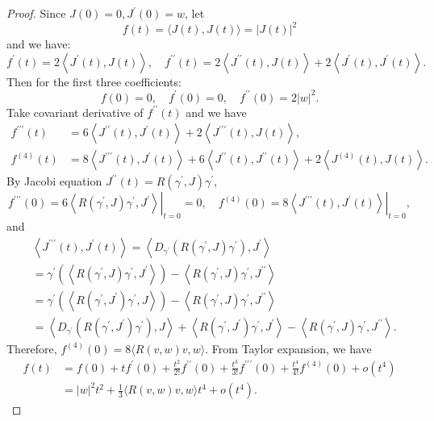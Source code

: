 \documentclass{ctexart}
\begin{document}
\begin{proof}[Proof]
  Since $J(0)=0, J^{\prime}(0)=w$, let 
  $$
  f(t)=\langle J(t), J(t)\rangle=|J(t)|^2
  $$
  and we have: 
  $$
  f^{\prime}(t)=2\left\langle J^{\prime}(t), J(t)\right\rangle, \quad f^{\prime \prime}(t)=2\left\langle J^{\prime \prime}(t), J(t)\right\rangle+2\left\langle J^{\prime}(t), J^{\prime}(t)\right\rangle .
  $$
  Then for the first three coefficients: 
  $$
  f(0)=0, \quad f^{\prime}(0)=0, \quad f^{\prime \prime}(0)=2|w|^2.
  $$
  Take covariant derivative of $f^{\prime \prime}(t)$ and we have 
  $$
  \begin{aligned}
  f^{\prime \prime \prime}(t) & =6\left\langle J^{\prime \prime}(t), J^{\prime}(t)\right\rangle+2\left\langle J^{\prime \prime \prime}(t), J(t)\right\rangle, \\
  f^{(4)}(t) & =8\left\langle J^{\prime \prime \prime}(t), J^{\prime}(t)\right\rangle+6\left\langle J^{\prime \prime}(t), J^{\prime \prime}(t)\right\rangle+2\left\langle J^{(4)}(t), J(t)\right\rangle .
  \end{aligned}
  $$
  By Jacobi equation $J^{\prime \prime}(t)= R\left(\gamma^{\prime}, J\right) \gamma^{\prime}$, 
  $$
  f^{\prime \prime \prime}(0)=\left.6\left\langle R\left(\gamma^{\prime}, J\right) \gamma^{\prime}, J^{\prime}\right\rangle\right|_{t=0}=0, \quad f^{(4)}(0)=\left.8\left\langle J^{\prime \prime \prime}(t), J^{\prime}(t)\right\rangle\right|_{t=0},
  $$
  and 
  $$
  \begin{aligned}
  &\left\langle J^{\prime \prime \prime}(t), J^{\prime}(t)\right\rangle=\left\langle D_{\gamma^{\prime}}\left( R\left(\gamma^{\prime}, J\right) \gamma^{\prime}\right), J^{\prime}\right\rangle \\
  &= \gamma^{\prime}\left(\left\langle R\left(\gamma^{\prime}, J\right) \gamma^{\prime}, J^{\prime}\right\rangle\right)-\left\langle R\left(\gamma^{\prime}, J\right) \gamma^{\prime}, J^{\prime \prime}\right\rangle \\
  &= \gamma^{\prime}\left(\left\langle R\left(\gamma^{\prime}, J^{\prime}\right) \gamma^{\prime}, J\right\rangle\right)-\left\langle R\left(\gamma^{\prime}, J\right) \gamma^{\prime}, J^{\prime \prime}\right\rangle \\
  &=\left\langle D_{\gamma^{\prime}}\left( R\left(\gamma^{\prime}, J^{\prime}\right) \gamma^{\prime}\right), J\right\rangle+\left\langle R\left(\gamma^{\prime}, J^{\prime}\right) \gamma^{\prime}, J^{\prime}\right\rangle
    -\left\langle R\left(\gamma^{\prime}, J\right) \gamma^{\prime}, J^{\prime \prime}\right\rangle .
  \end{aligned}
  $$
  Therefore, $f^{(4)}(0)=8\langle R(v, w) v, w\rangle$.
  From Taylor expansion, we have  
  $$
  \begin{aligned}
  f(t) & =f(0)+t f^{\prime}(0)+\frac{t^2}{2 !} f^{\prime \prime}(0)+\frac{t^3}{3 !} f^{\prime \prime \prime}(0)+\frac{t^4}{4 !} f^{(4)}(0)+o\left(t^4\right) \\
  & =|w|^2 t^2+\frac{1}{3}\langle R(v, w) v, w\rangle t^4+o\left(t^4\right). 
  \end{aligned}
  $$
\end{proof}
\end{document}
